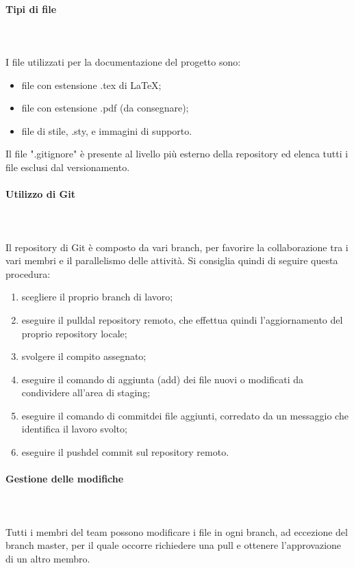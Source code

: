 \paragraph{Tipi di file} \mbox{} \\ \mbox{} \\
I file utilizzati per la documentazione del progetto sono: \begin{itemize}
\item file con estensione .tex di \LaTeX{};
\item file con estensione .pdf (da consegnare);
\item file di stile, .sty,  e immagini di supporto.
\end{itemize}
Il file ".gitignore" è presente al livello più esterno della repository ed elenca tutti i file esclusi dal versionamento.

\paragraph{Utilizzo di Git} \mbox{} \\ \mbox{} \\
Il repository di Git è composto da vari branch\glo, per favorire la collaborazione tra i vari membri e il parallelismo delle attività. Si consiglia quindi di seguire questa procedura:
\begin{enumerate}
\item scegliere il proprio branch di lavoro;
\item eseguire il pull\glo dal repository remoto, che effettua quindi l'aggiornamento del proprio repository locale;
\item svolgere il compito assegnato;
\item eseguire il comando di aggiunta (add) dei file nuovi o modificati da condividere all'area di staging\glo;
\item eseguire il comando di commit\glo dei file aggiunti, corredato da un messaggio che identifica il lavoro svolto;
\item eseguire il push\glo del commit sul repository remoto.
\end{enumerate}

\paragraph{Gestione delle modifiche}\mbox{} \\ \mbox{} \\
Tutti i membri del team possono modificare i file in ogni branch, ad eccezione del branch master, per il quale occorre richiedere una pull e ottenere l'approvazione di un altro membro.


